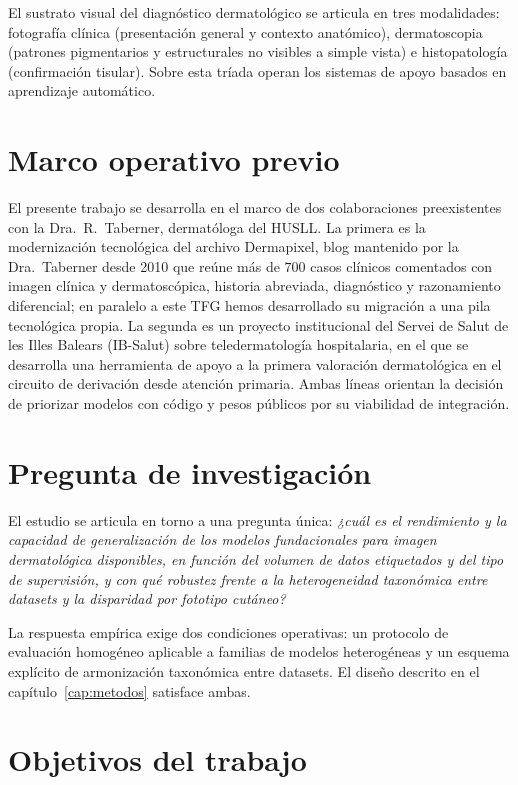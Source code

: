 El sustrato visual del diagnóstico dermatológico se articula en tres
modalidades: fotografía clínica (presentación general y contexto
anatómico), dermatoscopia (patrones pigmentarios y estructurales no
visibles a simple vista) e histopatología (confirmación
tisular). Sobre esta tríada operan los sistemas de apoyo basados en
aprendizaje automático.


\section{Marco operativo previo}
\label{sec:trabajo-previo}

El presente trabajo se desarrolla en el marco de dos colaboraciones
preexistentes con la Dra.~R.~Taberner, dermatóloga del HUSLL. La
primera es la modernización tecnológica del archivo Dermapixel,
blog mantenido por la Dra.~Taberner desde 2010 que reúne más de
$700$ casos clínicos comentados con imagen clínica y
dermatoscópica, historia abreviada, diagnóstico y razonamiento
diferencial; en paralelo a este TFG hemos desarrollado su migración a
una pila tecnológica propia. La segunda es un proyecto institucional del
Servei de Salut de les Illes Balears (IB-Salut) sobre
teledermatología hospitalaria, en el que se desarrolla una
herramienta de apoyo a la primera valoración dermatológica en el
circuito de derivación desde atención primaria. Ambas líneas
orientan la decisión de priorizar modelos con código y pesos
públicos por su viabilidad de integración.


\section{Pregunta de investigación}
\label{sec:pregunta}

El estudio se articula en torno a una pregunta única: \emph{¿cuál
es el rendimiento y la capacidad de generalización de los modelos
fundacionales para imagen dermatológica disponibles, en función del
volumen de datos etiquetados y del tipo de supervisión, y con qué
robustez frente a la heterogeneidad taxonómica entre datasets y la
disparidad por fototipo cutáneo?}

La respuesta empírica exige dos condiciones operativas: un
protocolo de evaluación homogéneo aplicable a familias de modelos
heterogéneas y un esquema explícito de armonización taxonómica
entre datasets. El diseño descrito en el
capítulo~\ref{cap:metodos} satisface ambas.


\section{Objetivos del trabajo}
\label{sec:objetivos}

